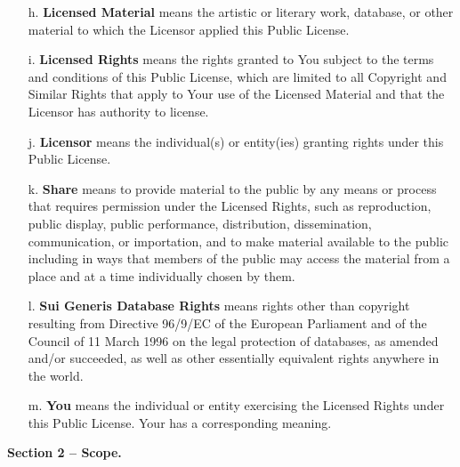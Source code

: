 \begin{itemize}
    \item[h.] \textbf{Licensed Material} means the artistic or literary work, database, or other material to which the Licensor applied this Public License.
    \item[i.] \textbf{Licensed Rights} means the rights granted to You subject to the terms and conditions of this Public License, which are limited to all Copyright and Similar Rights that apply to Your use of the Licensed Material and that the Licensor has authority to license.
    \item[j.] \textbf{Licensor} means the individual(s) or entity(ies) granting rights under this Public License.
    \item[k.] \textbf{Share} means to provide material to the public by any means or process that requires permission under the Licensed Rights, such as reproduction, public display, public performance, distribution, dissemination, communication, or importation, and to make material available to the public including in ways that members of the public may access the material from a place and at a time individually chosen by them.
    \item[l.] \textbf{Sui Generis Database Rights} means rights other than copyright resulting from Directive 96/9/EC of the European Parliament and of the Council of 11 March 1996 on the legal protection of databases, as amended and/or succeeded, as well as other essentially equivalent rights anywhere in the world.
    \item[m.] \textbf{You} means the individual or entity exercising the Licensed Rights under this Public License. Your has a corresponding meaning.
\end{itemize}

\begin{center}
    \textbf{Section 2 -- Scope.}
\end{center}

